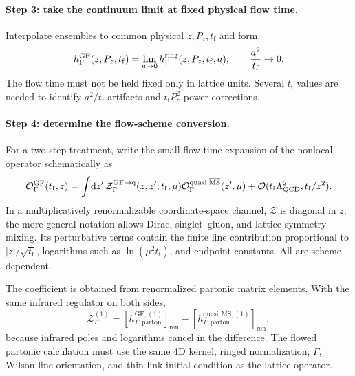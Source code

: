 \documentclass[11pt]{article}
\numberwithin{equation}{section}
\newcommand{\dd}{\mathrm{d}}
\newcommand{\MSbar}{\overline{\mathrm{MS}}}
\newcommand{\cO}{\mathcal{O}}
\newcommand{\tf}{t_{\mathrm f}}
\begin{document}
\paragraph{Step 3: take the continuum limit at fixed physical flow time.}
Interpolate ensembles to common physical \(z,P_z,\tf\) and form
\begin{equation}
  h_{\Gamma}^{\rm GF}(z,P_z,\tf)
  =\lim_{a\to0}
  h_{\Gamma}^{\rm ring}(z,P_z,\tf,a),
  \qquad \frac{a^2}{\tf}\to0.
  \label{eq:matching-step-continuum}
\end{equation}
The flow time must not be held fixed only in lattice units.  Several \(\tf\)
values are needed to identify \(a^2/\tf\) artifacts and
\(\tf P_z^2\) power corrections.

\paragraph{Step 4: determine the flow-scheme conversion.}
For a two-step treatment, write the small-flow-time expansion of the nonlocal
operator schematically as
\begin{equation}
  \cO_{\Gamma}^{\rm GF}(\tf,z)
  =
  \int\!\dd z'\,
  \mathcal Z_{\Gamma}^{\rm GF\to q}
    (z,z';\tf,\mu)
  \cO_{\Gamma}^{\rm quasi,\MSbar}(z',\mu)
  +\cO(\tf\Lambda_{\rm QCD}^2,\tf/z^2).
  \label{eq:flow-to-quasi-conversion}
\end{equation}
In a multiplicatively renormalizable coordinate-space channel,
\(\mathcal Z\) is diagonal in \(z\); the more general notation allows Dirac,
singlet--gluon, and lattice-symmetry mixing.  Its perturbative terms contain
the finite line contribution proportional to \(|z|/\sqrt{\tf}\), logarithms
such as \(\ln(\mu^2\tf)\), and endpoint constants.  All are scheme dependent.

The coefficient is obtained from renormalized partonic matrix elements.  With
the same infrared regulator on both sides,
\begin{equation}
  \mathcal Z_{\Gamma}^{(1)}
  =
  \left[h_{\Gamma,\mathrm{parton}}^{\mathrm{GF},(1)}\right]_{\mathrm{ren}}
  -
  \left[h_{\Gamma,\mathrm{parton}}^{\mathrm{quasi},\MSbar,(1)}\right]_{\mathrm{ren}},
  \label{eq:matching-coefficient-difference}
\end{equation}
because infrared poles and logarithms cancel in the difference.  The flowed
partonic calculation must use the same 4D kernel, ringed normalization,
\(\Gamma\), Wilson-line orientation, and thin-link initial condition as the
lattice operator.
\end{document}
